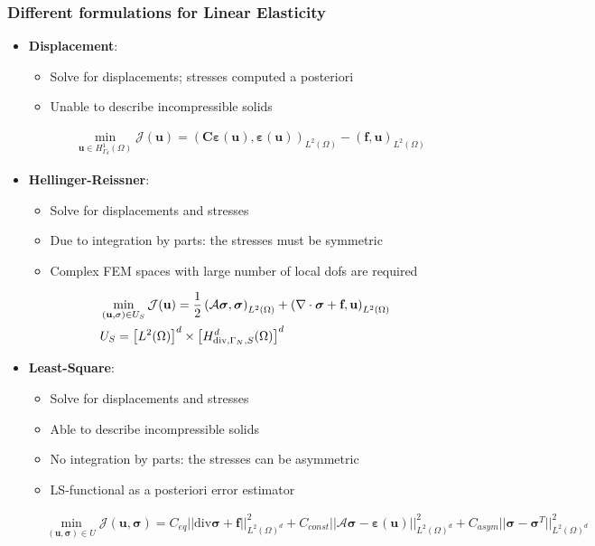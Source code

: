 \documentclass[8pt, oneside]{beamer}   	%
\newcommand{\bC}{\textbf{C}}
\newcommand{\bff}{\textbf{f}}
\newcommand{\bu}{\textbf{u}}
\newcommand{\bsigma}{\boldsymbol{\sigma}}
\begin{document}
\begin{frame}
\frametitle{\textbf{Different formulations for Linear Elasticity}}
\begin{itemize}
\item \textbf{Displacement}:  
\begin{itemize}
\item Solve for displacements; stresses computed a posteriori
\item Unable to describe incompressible solids
\end{itemize}
\footnotesize
\begin{align*}
&\min \limits_{\bu\in H_{\Gamma_{d}}^1(\Omega)}\mathcal{J}(\bu)=\left(\bC \boldsymbol{\varepsilon}(\bu), \boldsymbol{\varepsilon}(\bu) \right)_{L^2 \left(\Omega \right)} - \left( \bff, \bu \right)_{L^2 \left(\Omega \right)}
\end{align*}
\item  \textbf{Hellinger-Reissner}: 
\begin{itemize}
\item Solve for displacements and stresses
\item Due to integration by parts: the stresses must be symmetric
\item Complex FEM spaces with large number of local dofs are required
\end{itemize}
\small
\begin{align*}
&\min \limits_{(\bu,\sigma) \in U_S}\mathcal{J}(\bu)=\frac{1}{2}\left(\mathcal{A} \bsigma, \bsigma \right)_{L^2 \left(\Omega \right)} + \left(\nabla \cdot \bsigma + \bff, \bu \right)_{L^2 \left(\Omega \right)} \\
\footnotesize
&U_S=\left[L^2(\Omega)\right]^d  \times \left[H_{\text{div}, \Gamma_N,S}^d(\Omega)\right]^d
\end{align*}
\item \textbf{Least-Square}: 
\begin{itemize}
\item Solve for displacements and stresses
\item Able to describe incompressible solids
\item No integration by parts: the stresses can be asymmetric
\item LS-functional as a posteriori error estimator
\end{itemize}
\footnotesize
\begin{align*}
& \min \limits_{(\bu,\bsigma) \in  U }\mathcal{J}(\bu,\bsigma)=C_{eq} ||\text{div} \bsigma+\bff||_{L^2(\Omega)^d}^2+C_{const}||\mathcal{A}\bsigma -\boldsymbol{\varepsilon}(\bu)||_{L^2(\Omega)^d}^2  +C_{asym}||\bsigma -\bsigma^T||_{L^2(\Omega)^d}^2  \\

\end{align*}
\end{itemize}
\end{frame}
\end{document}
